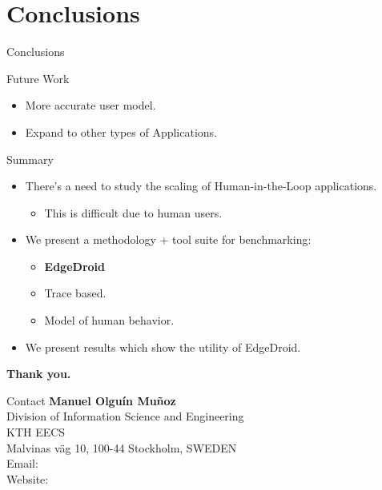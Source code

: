 \documentclass[aspectratio=1610]{beamer}
\begin{document}
\section{Conclusions}
\begin{frame}{Conclusions}
    \begin{block}{Future Work}
        \begin{itemize}
            \itemsep1em
            \item More accurate user model.
            \item Expand to other types of Applications.
        \end{itemize}
    \end{block}

    \begin{block}{Summary}
        \begin{itemize}
            \itemsep1em
            \item There's a need to study the scaling of Human-in-the-Loop applications.
                  \begin{itemize}
                      \item This is difficult due to human users.
                  \end{itemize}
            \item We present a methodology + tool suite for benchmarking:
                  \begin{itemize}
                      \item \textbf{EdgeDroid}
                      \item Trace based.
                      \item Model of human behavior.
                  \end{itemize}
            \item We present results which show the utility of EdgeDroid.
        \end{itemize}
    \end{block}
\end{frame}

\startpage
\begin{frame}{}
    \begin{center}
        \textbf{\Large Thank you.}\\
        \vspace{.1\textheight}%
        \begin{block}{\footnotesize Contact}
            \tiny%
            \textbf{Manuel Olguín Muñoz}\\
            Division of Information Science and Engineering\\
            KTH EECS\\
            Malvinas väg 10, 100-44 Stockholm, SWEDEN\\
            \vspace{.01\textheight}
            Email: \\
            Website: \\
        \end{block}
    \end{center}
    \vspace{.1\textheight}%
\end{frame}
\end{document}
